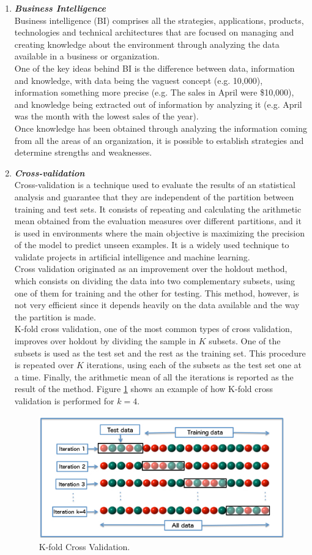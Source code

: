 \documentclass{article}
\begin{document}
\begin{enumerate}[label=(\alph*)]
\begin{enumerate}[label=\textbf{\arabic*.}]
            \item \textbf{\textit{Business Intelligence}}\\
Business intelligence (BI) comprises all the strategies, applications, products, technologies and technical architectures that are focused on managing and creating knowledge about the environment through analyzing the data available in a business or organization.\\
One of the key ideas behind BI is the difference between data, information and knowledge, with data being the vaguest concept (e.g. 10,000), information something more precise (e.g. The sales in April were \$10,000), and knowledge being extracted out of information by analyzing it (e.g. April was the month with the lowest sales of the year).\\
Once knowledge has been obtained through analyzing the information coming from all the areas of an organization, it is possible to establish strategies and determine strengths and weaknesses.

            \item \textbf{\textit{Cross-validation}}\\
Cross-validation is a technique used to evaluate the results of an statistical analysis and guarantee that they are independent of the partition between training and test sets. It consists of repeating and calculating the arithmetic mean obtained from the evaluation measures over different partitions, and it is used in environments where the main objective is maximizing the precision of the model to predict unseen examples. It is a widely used technique to validate projects in artificial intelligence and machine learning.\\
Cross validation originated as an improvement over the holdout method, which consists on dividing the data into two complementary subsets, using one of them for training and the other for testing. This method, however, is not very efficient since it depends heavily on the data available and the way the partition is made.\\
K-fold cross validation, one of the most common types of cross validation, improves over holdout by dividing the sample in $K$ subsets. One of the subsets is used as the test set and the rest as the training set. This procedure is repeated over $K$ iterations, using each of the subsets as the test set one at a time. Finally, the arithmetic mean of all the iterations is reported as the result of the method. Figure \ref{cross} shows an example of how K-fold cross validation is performed for $k=4$.
	\begin{figure}[ht]
		\centering
		\includegraphics[width=0.5\linewidth]{cross.jpg}
		\caption{K-fold Cross Validation.}
		\label{cross}
	\end{figure}
            

\end{enumerate}
\end{enumerate}
\end{document}
